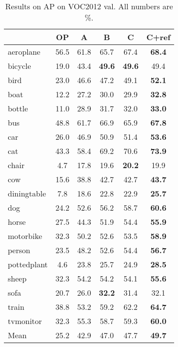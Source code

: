 \documentclass[runningheads]{llncs}
\newcommand\methodA{\textbf{A}}
\newcommand\methodB{\textbf{B}}
\newcommand\methodC{\textbf{C}}
\begin{document}
\begin{table}
\centering
\caption{Results on AP on VOC2012 val. All numbers are \%.}
\small{
\renewcommand{\tabcolsep}{1.5mm}
\begin{tabular}{l|ccccc}
 & OP & \methodA{} & \methodB{} & \methodC{} & \methodC{}+ref\\
\hline
 aeroplane & 56.5 & 61.8 & 65.7 & 67.4 & \textbf{68.4}\\
 bicycle & 19.0 & 43.4 & \textbf{49.6} & \textbf{49.6} & 49.4\\
 bird & 23.0 & 46.6 & 47.2 & 49.1 & \textbf{52.1}\\
 boat & 12.2 & 27.2 & 30.0 & 29.9 & \textbf{32.8}\\
 bottle & 11.0 & 28.9 & 31.7 & 32.0 & \textbf{33.0}\\
 bus & 48.8 & 61.7 & 66.9 & 65.9 & \textbf{67.8}\\
 car & 26.0 & 46.9 & 50.9 & 51.4 & \textbf{53.6}\\
 cat & 43.3 & 58.4 & 69.2 & 70.6 & \textbf{73.9}\\
 chair & 4.7 & 17.8 & 19.6 & \textbf{20.2} & 19.9\\
 cow & 15.6 & 38.8 & 42.7 & 42.7 & \textbf{43.7}\\
 diningtable & 7.8 & 18.6 & 22.8 & 22.9 & \textbf{25.7}\\
 dog & 24.2 & 52.6 & 56.2 & 58.7 & \textbf{60.6}\\
 horse & 27.5 & 44.3 & 51.9 & 54.4 & \textbf{55.9}\\
 motorbike & 32.3 & 50.2 & 52.6 & 53.5 & \textbf{58.9}\\
 person & 23.5 & 48.2 & 52.6 & 54.4 & \textbf{56.7}\\
 pottedplant & 4.6 & 23.8 & 25.7 & 24.9 & \textbf{28.5}\\
 sheep & 32.3 & 54.2 & 54.2 & 54.1 & \textbf{55.6}\\
 sofa & 20.7 & 26.0 & \textbf{32.2} & 31.4 & 32.1\\
 train & 38.8 & 53.2 & 59.2 & 62.2 & \textbf{64.7}\\
 tvmonitor & 32.3 & 55.3 & 58.7 & 59.3 & \textbf{60.0}\\
\hline
 Mean & 25.2 & 42.9 & 47.0 & 47.7 & \textbf{49.7}\\
\end{tabular}
}
\label{table:APr}
\end{table}
\end{document}
